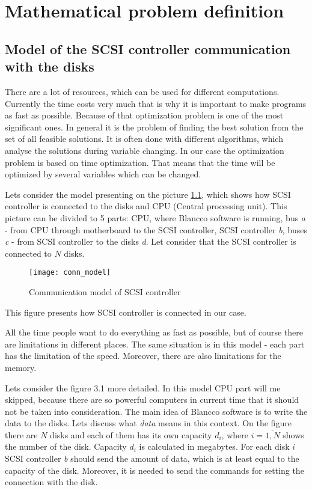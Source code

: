 \chapter{Mathematical problem definition}
\label{chap3:title}

\section{Model of the SCSI controller communication with the disks}
There are a lot of resources, which can be used for different computations. Currently the time costs very much that is why it is important to make programs as fast as possible. Because of that optimization problem is one of the most significant ones. In general it is the problem of finding the best solution from the set of all feasible solutions. It is often done with different algorithms, which analyse the solutions during variable changing. In our case the optimization problem is based on time optimization. That means that the time will be optimized by several variables which can be changed.

Lets consider the model presenting on the picture \ref{fig:conn_model}, which shows how SCSI controller is connected to the disks and CPU (Central processing unit). This picture can be divided to 5 parts: CPU, where Blancco software is running, bus \emph{a} - from CPU through motherboard to the SCSI controller, SCSI controller \emph{b}, buses \emph{c} - from SCSI controller to the disks \emph{d}. Let consider that the SCSI controller is connected to $N$ disks.

\begin{figure}[h]
\begin{center}
  \texttt{[image: conn\_model]}
\end{center}
  \caption{Communication model of SCSI controller}
  \label{fig:conn_model}
\end{figure}

This figure presents how SCSI controller is connected in our case.  

All the time people want to do everything as fast as possible, but of course there are limitations in different places. The same situation is in this model - each part has the limitation of the speed. Moreover, there are also limitations for the memory.


Lets consider the figure 3.1 more detailed. In this model CPU part will me skipped, because there are so powerful computers in current time that it should not be taken into consideration. The main idea of Blancco software is to write the data to the disks. Lets discuss what \emph{data} means in this context. On the figure there are $N$ disks and each of them has its own capacity $d_i$, where $i=\overline{1,N}$ shows the number of the disk. Capacity $d_i$ is calculated in megabytes. For each disk $i$ SCSI controller \emph{b} should send the amount of data, which is at least equal to the capacity of the disk. Moreover, it is needed to send the commands for setting the connection with the disk. 


